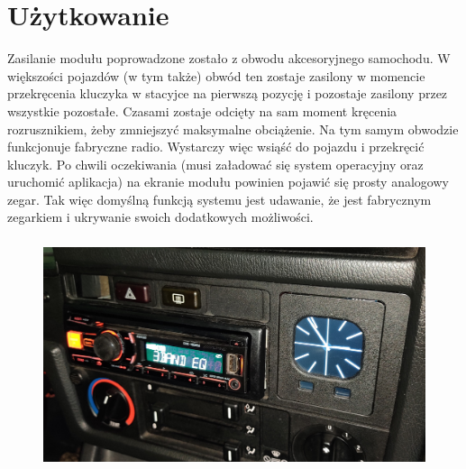 \documentclass[declaration,shortabstract, inz]{iithesis}
\begin{document}

\chapter{Użytkowanie}
Zasilanie modułu poprowadzone zostało z obwodu akcesoryjnego samochodu. W większości pojazdów (w tym także) obwód ten zostaje zasilony w momencie przekręcenia kluczyka w stacyjce na pierwszą pozycję i pozostaje zasilony przez wszystkie pozostałe. Czasami zostaje odcięty na sam moment kręcenia rozrusznikiem, żeby zmniejszyć maksymalne obciążenie. Na tym samym obwodzie funkcjonuje fabryczne radio. Wystarczy więc wsiąść do pojazdu i przekręcić kluczyk. Po chwili oczekiwania (musi załadować się system operacyjny oraz uruchomić aplikacja) na ekranie modułu powinien pojawić się prosty analogowy zegar. Tak więc domyślną funkcją systemu jest udawanie, że jest fabrycznym zegarkiem i ukrywanie swoich dodatkowych możliwości.

\begin{figure}[htp]
    \centering
    \includegraphics[width=12cm, height=6.75cm]{images/cocpit_clock.jpg}
    \label{fig:cocpit_clock}
\end{figure}
\end{document}
